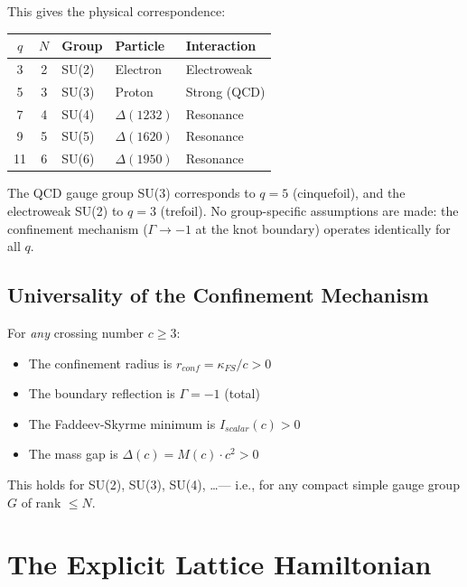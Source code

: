 This gives the physical correspondence:

\begin{center}
\small
\begin{tabular}{cclll}
\toprule
$q$ & $N$ & \textbf{Group} & \textbf{Particle} & \textbf{Interaction} \\
\midrule
3 & 2 & SU(2) & Electron   & Electroweak \\
5 & 3 & SU(3) & Proton     & Strong (QCD) \\
7 & 4 & SU(4) & $\Delta(1232)$ & Resonance \\
9 & 5 & SU(5) & $\Delta(1620)$ & Resonance \\
11 & 6 & SU(6) & $\Delta(1950)$ & Resonance \\
\bottomrule
\end{tabular}
\end{center}

The QCD gauge group SU(3) corresponds to $q = 5$ (cinquefoil),
and the electroweak SU(2) to $q = 3$ (trefoil).  No
group-specific assumptions are made: the confinement mechanism
($\Gamma \to -1$ at the knot boundary) operates identically for all $q$.

\subsection{Universality of the Confinement Mechanism}

For \textit{any} crossing number $c \ge 3$:
\begin{itemize}
    \item The confinement radius is $r_{conf} = \kappa_{FS}/c > 0$
    \item The boundary reflection is $\Gamma = -1$ (total)
    \item The Faddeev-Skyrme minimum is $I_{scalar}(c) > 0$
    \item The mass gap is $\Delta(c) = M(c) \cdot c^2 > 0$
\end{itemize}
This holds for SU(2), SU(3), SU(4), \ldots --- i.e., for any
compact simple gauge group $G$ of rank $\le N$.

\section{The Explicit Lattice Hamiltonian}
\label{sec:lattice_hamiltonian}

